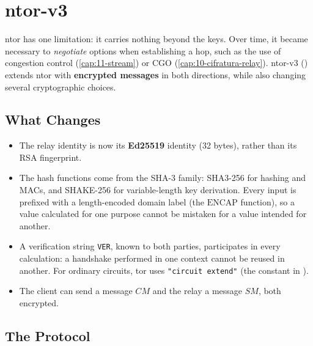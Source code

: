 \section{ntor-v3}\label{sec:ntor3}

ntor has one limitation: it carries nothing beyond the keys. Over time, it became necessary to \emph{negotiate} options when establishing a hop, such as the use of congestion control (\cref{cap:11-stream}) or CGO (\cref{cap:10-cifratura-relay}). ntor-v3 () extends ntor with \textbf{encrypted messages} in both directions, while also changing several cryptographic choices.

\subsection{What Changes}

\begin{itemize}
  \item The relay identity is now its \textbf{Ed25519} identity (32 bytes), rather than its RSA fingerprint.
  \item The hash functions come from the SHA-3 family: SHA3-256 for hashing and MACs, and SHAKE-256 for variable-length key derivation. Every input is prefixed with a length-encoded domain label (the $\mathrm{ENCAP}$ function), so a value calculated for one purpose cannot be mistaken for a value intended for another.
  \item A verification string \texttt{VER}, known to both parties, participates in every calculation: a handshake performed in one context cannot be reused in another. For ordinary circuits, tor uses \texttt{"circuit extend"} (the  constant in ).
  \item The client can send a message $CM$ and the relay a message $SM$, both encrypted.
\end{itemize}

\subsection{The Protocol}

